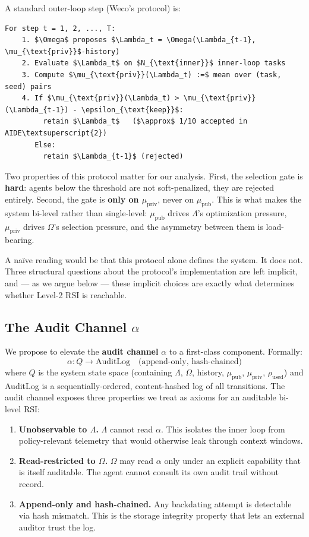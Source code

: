 A standard outer-loop step (Weco's protocol) is:

\begin{verbatim}
For step t = 1, 2, ..., T:
    1. $\Omega$ proposes $\Lambda_t = \Omega(\Lambda_{t-1}, \mu_{\text{priv}}$-history)
    2. Evaluate $\Lambda_t$ on $N_{\text{inner}}$ inner-loop tasks
    3. Compute $\mu_{\text{priv}}(\Lambda_t) :=$ mean over (task, seed) pairs
    4. If $\mu_{\text{priv}}(\Lambda_t) > \mu_{\text{priv}}(\Lambda_{t-1}) - \epsilon_{\text{keep}}$:
         retain $\Lambda_t$   ($\approx$ 1/10 accepted in AIDE\textsuperscript{2})
       Else:
         retain $\Lambda_{t-1}$ (rejected)
\end{verbatim}

Two properties of this protocol matter for our analysis. First, the selection gate is \textbf{hard}: agents below the threshold are not soft-penalized, they are rejected entirely. Second, the gate is \textbf{only on $\mu_{\text{priv}}$}, never on $\mu_{\text{pub}}$. This is what makes the system bi-level rather than single-level: $\mu_{\text{pub}}$ drives $\Lambda$'s optimization pressure, $\mu_{\text{priv}}$ drives $\Omega$'s selection pressure, and the asymmetry between them is load-bearing.

A na\"ive reading would be that this protocol alone defines the system. It does not. Three structural questions about the protocol's implementation are left implicit, and --- as we argue below --- these implicit choices are exactly what determines whether Level-2 RSI is reachable.

\subsection{The Audit Channel $\alpha$}

We propose to elevate the \textbf{audit channel} $\alpha$ to a first-class component. Formally:
\[
\alpha : Q \to \text{AuditLog} \quad \text{(append-only, hash-chained)}
\]
where $Q$ is the system state space (containing $\Lambda$, $\Omega$, history, $\mu_{\text{pub}}$, $\mu_{\text{priv}}$, $\rho_{\text{used}}$) and AuditLog is a sequentially-ordered, content-hashed log of all transitions. The audit channel exposes three properties we treat as axioms for an auditable bi-level RSI:

\begin{enumerate}
    \item \textbf{Unobservable to $\Lambda$.} $\Lambda$ cannot read $\alpha$. This isolates the inner loop from policy-relevant telemetry that would otherwise leak through context windows.
    \item \textbf{Read-restricted to $\Omega$.} $\Omega$ may read $\alpha$ only under an explicit capability that is itself auditable. The agent cannot consult its own audit trail without record.
    \item \textbf{Append-only and hash-chained.} Any backdating attempt is detectable via hash mismatch. This is the storage integrity property that lets an external auditor trust the log.
\end{enumerate}

